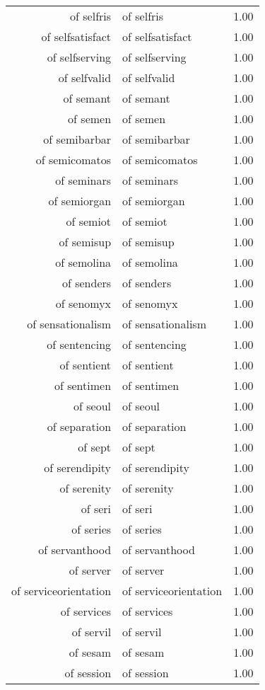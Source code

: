 \begin{table}[ht]
\begin{tabular}{rlr}
  of selfris & of selfris & 1.00 \\ 
  of selfsatisfact & of selfsatisfact & 1.00 \\ 
  of selfserving & of selfserving & 1.00 \\ 
  of selfvalid & of selfvalid & 1.00 \\ 
  of semant & of semant & 1.00 \\ 
  of semen & of semen & 1.00 \\ 
  of semibarbar & of semibarbar & 1.00 \\ 
  of semicomatos & of semicomatos & 1.00 \\ 
  of seminars & of seminars & 1.00 \\ 
  of semiorgan & of semiorgan & 1.00 \\ 
  of semiot & of semiot & 1.00 \\ 
  of semisup & of semisup & 1.00 \\ 
  of semolina & of semolina & 1.00 \\ 
  of senders & of senders & 1.00 \\ 
  of senomyx & of senomyx & 1.00 \\ 
  of sensationalism & of sensationalism & 1.00 \\ 
  of sentencing & of sentencing & 1.00 \\ 
  of sentient & of sentient & 1.00 \\ 
  of sentimen & of sentimen & 1.00 \\ 
  of seoul & of seoul & 1.00 \\ 
  of separation & of separation & 1.00 \\ 
  of sept & of sept & 1.00 \\ 
  of serendipity & of serendipity & 1.00 \\ 
  of serenity & of serenity & 1.00 \\ 
  of seri & of seri & 1.00 \\ 
  of series & of series & 1.00 \\ 
  of servanthood & of servanthood & 1.00 \\ 
  of server & of server & 1.00 \\ 
  of serviceorientation & of serviceorientation & 1.00 \\ 
  of services & of services & 1.00 \\ 
  of servil & of servil & 1.00 \\ 
  of sesam & of sesam & 1.00 \\ 
  of session & of session & 1.00 \\ 

\end{tabular}
\end{table}
